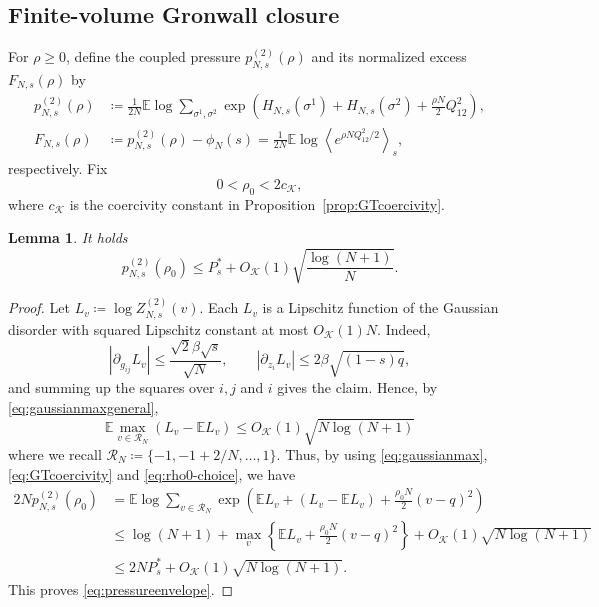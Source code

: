 \documentclass[11pt]{article}
\newtheorem{lemma}[theorem]{Lemma}
\numberwithin{equation}{section}
\newcommand{\E}{\mathbb{E}}
\newcommand{\1}{\mathbf 1}
\newcommand{\cK}{\mathcal K}
\newcommand{\braket}[1]{\left\langle #1\right\rangle}
\begin{document}
\subsection{Finite-volume Gronwall closure}\label{subsec:gronwall}

For $\rho\ge0$, define the coupled pressure $p^{(2)}_{N,s}(\rho)$ and its normalized excess $F_{N,s}(\rho)$ by
\begin{align}
 p^{(2)}_{N,s}(\rho)
 &\coloneqq
 \frac1{2N}\E\log
 \sum_{\sigma^1,\sigma^2}
 \exp\left(
 H_{N,s}(\sigma^1)+H_{N,s}(\sigma^2)
 +\frac{\rho N}{2}Q_{12}^2\right),
 \label{eq:quadraticpressure}\\
 F_{N,s}(\rho)
 &\coloneqq
 p^{(2)}_{N,s}(\rho)-\phi_N(s)
 =
 \frac1{2N}\E\log
 \braket{e^{\rho NQ_{12}^2/2}}_s ,
 \label{eq:normalizedcoupling}
\end{align}
respectively.
Fix
\begin{equation}
 0<\rho_0<2c_{\cK},
 \label{eq:rho0-choice}
\end{equation}
where $c_{\cK}$ is the coercivity constant in
Proposition~\ref{prop:GTcoercivity}.

\begin{lemma}
\label{lem:sublinearpressure}
It holds
\begin{equation}
 p^{(2)}_{N,s}(\rho_0)\le P_s^*+O_{\cK}(1) 
 \sqrt{\frac{\log(N+1)}N}.
 \label{eq:pressureenvelope}
\end{equation}

\end{lemma}

\begin{proof}
Let $L_v\coloneqq\log Z^{(2)}_{N,s}(v)$.  Each $L_v$ is a Lipschitz function
of the Gaussian disorder with squared Lipschitz constant at most
$O_{\cK}(1)N$.  Indeed,
\[
 \left|\partial_{g_{ij}}L_v\right|
 \le\frac{\sqrt2\beta\sqrt s}{\sqrt N},\qquad
 \left|\partial_{z_i}L_v\right|
 \le2\beta\sqrt{(1-s)q},
\]
and summing up the squares over $i,j$ and $i$ gives the claim.  Hence, by \eqref{eq:gaussianmaxgeneral}, 
\begin{equation}
 \E\max_{v\in\mathcal R_N}(L_v-\E L_v)
 \le O_{\cK}(1)\sqrt{N\log(N+1)}
 \label{eq:gaussianmax}
\end{equation}
where we recall $\mathcal R_N \coloneqq \{ -1,-1+2/N,\ldots,1\}$.
Thus, by using \eqref{eq:gaussianmax},
\eqref{eq:GTcoercivity} and \eqref{eq:rho0-choice}, we have
\begin{align*}
 2Np^{(2)}_{N,s}(\rho_0)
 &=
 \E\log\sum_{v\in\mathcal R_N}
 \exp\left(\E L_v + (L_v - \E L_v ) +\frac{\rho_0N}{2}(v-q)^2\right)\\
 &\le
 \log(N+1)+
 \max_v\left\{\E L_v+\frac{\rho_0N}{2}(v-q)^2\right\}
 +O_{\cK}(1)\sqrt{N\log(N+1)}\\
 &\le2NP_s^*+O_{\cK}(1) 
 \sqrt{{N\log(N+1)}}.
\end{align*}
This proves \eqref{eq:pressureenvelope}.
\end{proof}
\end{document}
